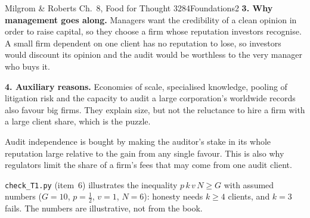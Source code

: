 \begin{exsol}{Milgrom \& Roberts Ch.~8, Food for Thought 3}{284}{Foundations}{2}
\textbf{3. Why management goes along.} Managers want the credibility of a clean opinion in order to raise
capital, so they choose a firm whose reputation investors recognise. A small firm dependent on one client
has no reputation to lose, so investors would discount its opinion and the audit would be worthless to
the very manager who buys it.

\textbf{4. Auxiliary reasons.} Economies of scale, specialised knowledge, pooling of litigation risk and
the capacity to audit a large corporation's worldwide records also favour big firms. They explain size,
but not the reluctance to hire a firm with a large client share, which is the puzzle.

\interp Audit independence is bought by making the auditor's stake in its whole reputation large
relative to the gain from any single favour. This is also why regulators limit the share of a firm's fees
that may come from one audit client.

\verify \texttt{check\_T1.py} (item~6) illustrates the inequality $p\,k\,v\,N \ge G$ with assumed numbers
($G = 10$, $p = \frac12$, $v = 1$, $N = 6$): honesty needs $k \ge 4$ clients, and $k = 3$ fails. The numbers
are illustrative, not from the book.

\end{exsol}
